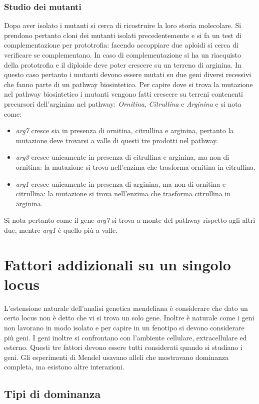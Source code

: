 \subsubsection{Studio dei mutanti}
Dopo aver isolato i mutanti si cerca di ricostruire la loro storia molecolare. Si prendono pertanto cloni dei mutanti isolati precedentemente e si fa un test di complementazione per prototrofia: 
facendo accoppiare due aploidi si cerca di verificare se complementano. In caso di complementazione si ha un riacquisto della prototrofia e il diploide deve poter crescere su un terreno di arginina. In
questo caso pertanto i mutanti devono essere mutati su due geni diversi recessivi che fanno parte di un pathway biosintetico. Per capire dove si trova la mutazione nel pathway biosintetico i mutanti 
vengono fatti crescere su terreni contenenti precursori dell'arginina nel pathway: \emph{Ornitina}, \emph{Citrullina} e \emph{Arginina} e si nota come: 
\begin{itemize}
	\item \emph{arg7} cresce sia in presenza di ornitina, citrullina e arginina, pertanto la mutazione deve trovarsi a valle di questi tre prodotti nel pathway.
	\item \emph{arg3} cresce unicamente in presenza di citrullina e arginina, ma non di ornitina: la mutazione si trova nell'enzima che trasforma ornitina in citrullina.
	\item \emph{arg1} cresce unicamente in presenza di arginina, ma non di ornitina e citrullina: la mutazione si trova nell'enzima che  trasforma citrullina in arginina.
\end{itemize}
Si nota pertanto come il gene \emph{arg7} si trova a monte del pathway rispetto agli altri due, mentre \emph{arg1} \`e quello pi\`u a valle.
\section{Fattori addizionali su un singolo locus}
L'estensione naturale dell'analisi genetica mendeliana \`e considerare che dato un certo locus non \`e detto che vi si trova un solo gene. Inoltre \`e naturale come i geni non 
lavorano in modo isolato e per capire in un fenotipo si devono considerare pi\`u geni. I geni inoltre si confrontano con l'ambiente cellulare, extracellulare ed esterno. Questi tre
fattori devono essere tutti considerati quando si studiano i geni. Gli esperimenti di Mendel usavano alleli che mostravano dominanza completa, ma esistono altre interazioni.
\subsection{Tipi di dominanza}
